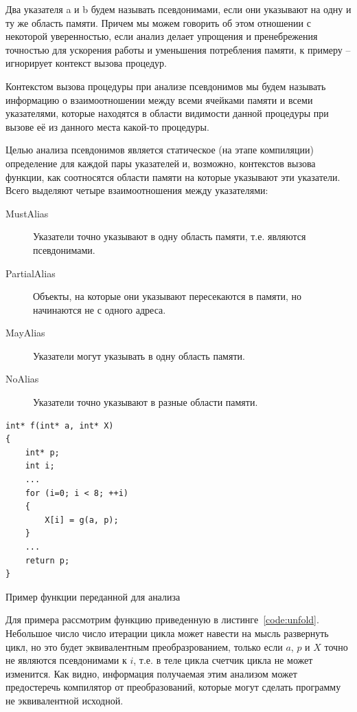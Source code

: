 \begin{mydefinition}
Два указателя a и b будем называть псевдонимами, если они указывают на одну и ту же область памяти. Причем мы можем говорить об этом отношении с некоторой уверенностью, если анализ делает упрощения и пренебрежения точностью для ускорения работы и уменьшения потребления памяти, к примеру -- игнорирует контекст вызова процедур.
\end{mydefinition}

\begin{mydefinition}
Контекстом вызова процедуры при анализе псевдонимов мы будем называть информацию о взаимоотношении между всеми ячейками памяти и всеми указателями, которые находятся в области видимости данной процедуры при вызове её из данного места какой-то процедуры. 
\end{mydefinition}

Целью анализа псевдонимов является статическое (на этапе компиляции) определение для каждой пары указателей и, возможно, контекстов вызова функции, как соотносятся области памяти на которые указывают эти указатели. Всего выделяют четыре взаимоотношения между указателями:
\begin{description}
  \item[MustAlias] Указатели точно указывают в одну область памяти, т.е. являются псевдонимами.
  \item[PartialAlias] Объекты, на которые они указывают пересекаются в памяти, но начинаются не с одного адреса.
  \item[MayAlias] Указатели могут указывать в одну область памяти.
  \item[NoAlias] Указатели точно указывают в разные области памяти.
\end{description}

\begin{ListingEnv}[H]
\begin{lstlisting}
int* f(int* a, int* X)
{
    int* p;
    int i;
    ...
    for (i=0; i < 8; ++i)
    {
        X[i] = g(a, p);
    }
    ...
    return p;
}
\end{lstlisting}
\caption{Пример функции переданной для анализа}
\label{code:unfold}
\end{ListingEnv}

Для примера рассмотрим функцию приведенную в листинге~\ref{code:unfold}. Небольшое число число итерации цикла может навести на мысль развернуть цикл, но это будет эквивалентным преобразрованием, только если $a$, $p$ и $X$ точно не являются псевдонимами к $i$, т.е. в теле цикла счетчик цикла не может изменится. Как видно, информация получаемая этим анализом может предостеречь компилятор от преобразований, которые могут сделать программу не эквивалентной исходной.

